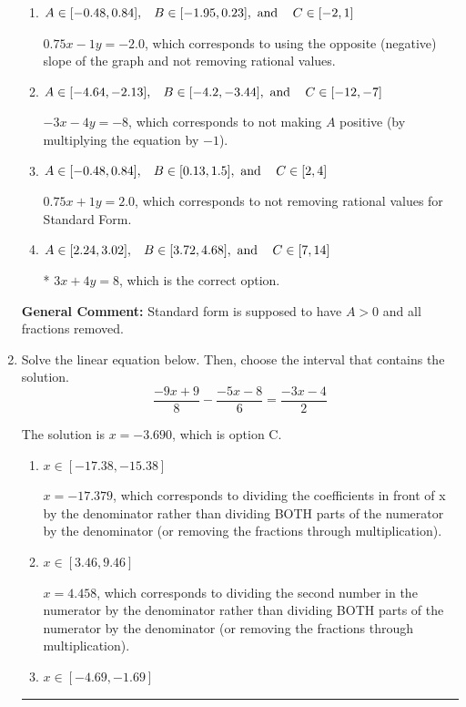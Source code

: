 \documentclass{extbook}[14pt]
\newcommand{\litem}[1]{\item #1

\rule{\textwidth}{0.4pt}}
\begin{document}
\begin{enumerate}
{\begin{enumerate}[label=\Alph*.]
 $3x - 4y = -8$, which corresponds to using the opposite (negative) slope of the graph, but did everything else correctly.
\item \( A \in [-0.48, 0.84], \hspace{3mm} B \in [-1.95, 0.23], \text{ and } \hspace{3mm} C \in [-2, 1] \)

 $0.75x - 1y = -2.0$, which corresponds to using the opposite (negative) slope of the graph and not removing rational values.
\item \( A \in [-4.64, -2.13], \hspace{3mm} B \in [-4.2, -3.44], \text{ and } \hspace{3mm} C \in [-12, -7] \)

 $-3x - 4y = -8$, which corresponds to not making $A$ positive (by multiplying the equation by $-1$).
\item \( A \in [-0.48, 0.84], \hspace{3mm} B \in [0.13, 1.5], \text{ and } \hspace{3mm} C \in [2, 4] \)

 $0.75x + 1y = 2.0$, which corresponds to not removing rational values for Standard Form.
\item \( A \in [2.24, 3.02], \hspace{3mm} B \in [3.72, 4.68], \text{ and } \hspace{3mm} C \in [7, 14] \)

* $3x + 4y = 8$, which is the correct option.
\end{enumerate}

\textbf{General Comment:} Standard form is supposed to have $A > 0$ and all fractions removed.
}
\litem{
Solve the linear equation below. Then, choose the interval that contains the solution.
\[ \frac{-9x + 9}{8} - \frac{-5x -8}{6} = \frac{-3x -4}{2} \]

The solution is \( x = -3.690 \), which is option C.\begin{enumerate}[label=\Alph*.]
\item \( x \in [-17.38, -15.38] \)

 $x = -17.379$, which corresponds to dividing the coefficients in front of x by the denominator rather than dividing BOTH parts of the numerator by the denominator (or removing the fractions through multiplication).
\item \( x \in [3.46, 9.46] \)

 $x = 4.458$, which corresponds to dividing the second number in the numerator by the denominator rather than dividing BOTH parts of the numerator by the denominator (or removing the fractions through multiplication).
\item \( x \in [-4.69, -1.69] \)


\end{enumerate}}
\end{enumerate}
\end{document}
